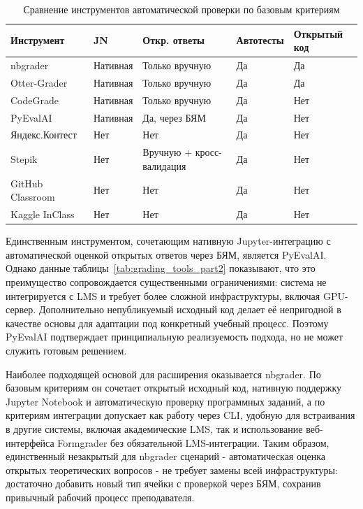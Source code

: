 \begin{table}[h!]
\LeftCaption
\caption{Сравнение инструментов автоматической проверки по базовым критериям}
\label{tab:grading_tools_part1}
\centering
\begin{tabular}{|p{3.3cm}|p{2.5cm}|p{3.3cm}|p{2.5cm}|p{2.5cm}|}
\hline
\textbf{Инструмент} & \textbf{JN} & \textbf{Откр. ответы} &
\textbf{Автотесты} & \textbf{Открытый код}\\
\hline
nbgrader        & Нативная & Только вручную & Да  & Да \\
\hline
Otter-Grader    & Нативная & Только вручную & Да  & Да \\
\hline
CodeGrade       & Нативная & Только вручную & Да  & Нет \\
\hline
PyEvalAI        & Нативная & Да, через БЯМ  & Да  & Нет \\
\hline
Яндекс.Контест  & Нет      & Нет            & Да  & Нет \\
\hline
Stepik          & Нет      & Вручную + кросс-валидация & Да  & Нет \\
\hline
GitHub Classroom& Нет      & Нет            & Да  & Нет \\
\hline
Kaggle InClass  & Нет      & Нет            & Да  & Нет \\
\hline
\end{tabular}
\end{table}

Единственным инструментом, сочетающим нативную Jupyter-интеграцию с автоматической оценкой
открытых ответов через БЯМ, является PyEvalAI. Однако
данные таблицы~\ref{tab:grading_tools_part2} показывают, что это преимущество
сопровождается существенными ограничениями: система не интегрируется с LMS и
требует более сложной инфраструктуры, включая GPU-сервер. Дополнительно
непубликуемый исходный код делает её непригодной в качестве основы для
адаптации под конкретный учебный процесс. Поэтому PyEvalAI подтверждает
принципиальную реализуемость подхода, но не может служить готовым решением.

Наиболее подходящей основой для расширения
оказывается nbgrader. По базовым критериям он сочетает открытый исходный код,
нативную поддержку Jupyter Notebook и автоматическую проверку программных
заданий, а по критериям интеграции допускает как работу через CLI, удобную для
встраивания в другие системы, включая академические LMS, так и использование
веб-интерфейса Formgrader без обязательной LMS-интеграции. Таким образом,
единственный незакрытый для nbgrader сценарий - автоматическая оценка открытых
теоретических вопросов - не требует замены всей инфраструктуры: достаточно
добавить новый тип ячейки с проверкой через БЯМ, сохранив привычный рабочий
процесс преподавателя.

